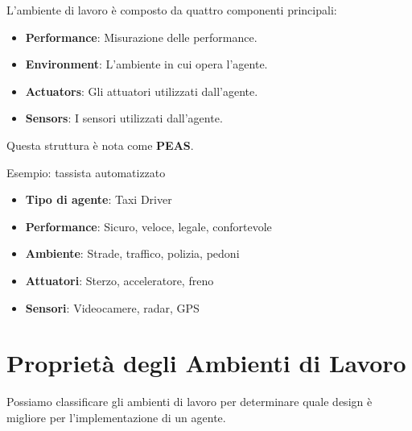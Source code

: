 L'ambiente di lavoro è composto da quattro componenti principali:

\begin{itemize}
	\item \textbf{Performance}: Misurazione delle performance.
	\item \textbf{\foreignlanguage{english}{Environment}}: L'ambiente in cui opera l'agente.
	\item \textbf{\foreignlanguage{english}{Actuators}}: Gli attuatori utilizzati dall'agente.
	\item \textbf{\foreignlanguage{english}{Sensors}}: I sensori utilizzati dall'agente.
\end{itemize}

Questa struttura è nota come \textbf{PEAS}.

Esempio: tassista automatizzato

\begin{itemize}
	\item \textbf{Tipo di agente}: Taxi Driver
	\item \textbf{Performance}: Sicuro, veloce, legale, confortevole
	\item \textbf{Ambiente}: Strade, traffico, polizia, pedoni
	\item \textbf{Attuatori}: Sterzo, acceleratore, freno
	\item \textbf{Sensori}: Videocamere, radar, GPS
\end{itemize}

\section{Proprietà degli Ambienti di Lavoro}

Possiamo classificare gli ambienti di lavoro per determinare quale design
è migliore per l'implementazione di un agente.

